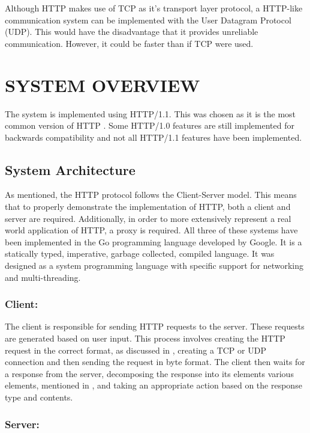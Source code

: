\documentclass[10pt,twocolumn]{witseiepaper}
\begin{document}
	Although HTTP makes use of TCP as it's transport layer protocol, a HTTP-like communication system can be implemented with the User Datagram Protocol (UDP). This would have the disadvantage that it provides unreliable communication. However, it could be faster than if TCP were used.


\section{SYSTEM OVERVIEW} \label{sysover}

The system is implemented using HTTP/1.1. This was chosen as it is the most common version of HTTP \cite{}. Some HTTP/1.0 features are still implemented for backwards compatibility and not all HTTP/1.1 features have been implemented.

	\subsection{System Architecture}

	As mentioned, the HTTP protocol follows the Client-Server model. This means that to properly demonstrate the implementation of HTTP, both a client and server are required. Additionally, in order to more extensively represent a real world application of HTTP, a proxy is required. All three of these systems have been implemented in the Go programming language developed by Google. It is a statically typed, imperative, garbage collected, compiled language. It was designed as a system programming language with specific support for networking and multi-threading.

	\subsubsection{Client:}

	The client is responsible for sending HTTP requests to the server. These requests are generated based on user input. This process involves creating the HTTP request in the correct format, as discussed in , creating a TCP or UDP connection and then sending the request in byte format. The client then waits for a response from the server, decomposing the response into its elements various elements, mentioned in , and taking an appropriate action based on the response type and contents.

	\subsubsection{Server:}
\end{document}
